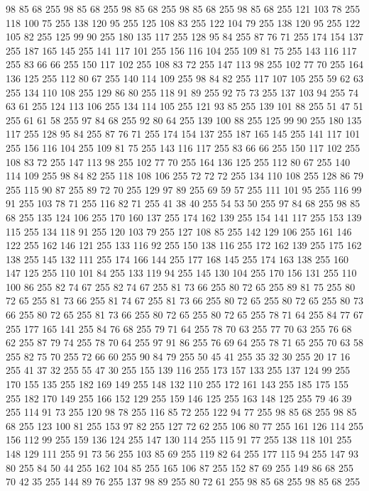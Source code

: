 98 85 68 255 98 85 68 255 98 85 68 255 98 85 68 255 98 85 68 255 121 103 78 255 118 100 75 255 138 120 95 255 125 108 83 255 122 104 79 255 138 120 95 255 122 105 82 255 125 99 90 255 180 135 117 255 128 95 84 255 87 76 71 255 174 154 137 255 187 165 145 255 141 117 101 255 156 116 104 255 109 81 75 255 143 116 117 255 83 66 66 255 150 117 102 255 108 83 72 255 147 113 98 255 102 77 70 255 164 136 125 255 112 80 67 255 140 114 109 255 98 84 82 255 117 107 105 255 59 62 63 255 134 110 108 255 129 86 80 255 118 91 89 255 92 75 73 255 137 103 94 255 74 63 61 255 124 113 106 255 134 114 105 255 121 93 85 255 139 101 88 255 51 47 51 255 61 61 58 255 97 84 68 255 92 80 64 255 139 100 88 255 125 99 90 255 180 135 117 255 128 95 84 255 87 76 71 255 174 154 137 255 187 165 145 255 141 117 101 255 156 116 104 255 109 81 75 255 143 116 117 255 83 66 66 255 150 117 102 255 108 83 72 255 147 113 98 255 102 77 70 255 164 136 125 255
112 80 67 255 140 114 109 255 98 84 82 255 118 108 106 255 72 72 72 255 134 110 108 255 128 86 79 255 115 90 87 255 89 72 70 255 129 97 89 255 69 59 57 255 111 101 95 255 116 99 91 255 103 78 71 255 116 82 71 255 41 38 40 255 54 53 50 255 97 84 68 255 98 85 68 255 135 124 106 255 170 160 137 255 174 162 139 255 154 141 117 255 153 139 115 255 134 118 91 255 120 103 79 255 127 108 85 255 142 129 106 255 161 146 122 255 162 146 121 255 133 116 92 255 150 138 116 255 172 162 139 255 175 162 138 255 145 132 111 255 174 166 144 255 177 168 145 255 174 163 138 255 160 147 125 255 110 101 84 255 133 119 94 255 145 130 104 255 170 156 131 255 110 100 86 255 82 74 67 255 82 74 67 255 81 73 66 255 80 72 65 255 89 81 75 255 80 72 65 255 81 73 66 255 81 74 67 255 81 73 66 255 80 72 65 255 80 72 65 255 80 73 66 255 80 72 65 255 81 73 66 255 80 72 65 255 80 72 65 255 78 71 64 255 84 77 67 255 177 165 141 255 84 76 68 255
79 71 64 255 78 70 63 255 77 70 63 255 76 68 62 255 87 79 74 255 78 70 64 255 97 91 86 255 76 69 64 255 78 71 65 255 70 63 58 255 82 75 70 255 72 66 60 255 90 84 79 255 50 45 41 255 35 32 30 255 20 17 16 255 41 37 32 255 55 47 30 255 155 139 116 255 173 157 133 255 137 124 99 255 170 155 135 255 182 169 149 255 148 132 110 255 172 161 143 255 185 175 155 255 182 170 149 255 166 152 129 255 159 146 125 255 163 148 125 255 79 46 39 255 114 91 73 255 120 98 78 255 116 85 72 255 122 94 77 255 98 85 68 255 98 85 68 255 123 100 81 255 153 97 82 255 127 72 62 255 106 80 77 255 161 126 114 255 156 112 99 255 159 136 124 255 147 130 114 255 115 91 77 255 138 118 101 255 148 129 111 255 91 73 56 255 103 85 69 255 119 82 64 255 177 115 94 255 147 93 80 255 84 50 44 255 162 104 85 255 165 106 87 255 152 87 69 255 149 86 68 255 70 42 35 255 144 89 76 255 137 98 89 255 80 72 61 255 98 85 68 255 98 85 68 255
